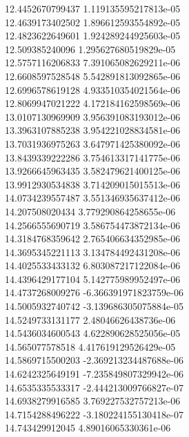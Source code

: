 {12.4452670799437 1.119135595217813e-05 \\
12.4639173402502 1.896612593554892e-05 \\
12.4823622649601 1.924289244925603e-05 \\
12.509385240096 1.295627680519829e-05 \\
12.5757116206833 7.391065082629211e-06 \\
12.6608597528548 5.542891813092865e-06 \\
12.6996578619128 4.933510354021564e-06 \\
12.8069947021222 4.172184162598569e-06 \\
13.0107130969909 3.956391083193012e-06 \\
13.3963107885238 3.954221028834581e-06 \\
13.7031936975263 3.647971425380092e-06 \\
13.8439339222286 3.754613317141775e-06 \\
13.9266645963435 3.582479621400125e-06 \\
13.9912930534838 3.714209015015513e-06 \\
14.0734239557487 3.551346935637412e-06 \\
14.207508020434 3.779290864258655e-06 \\
14.2566555690719 3.586754473872134e-06 \\
14.3184768359642 2.765406634352985e-06 \\
14.3695345221113 3.134784492431208e-06 \\
14.4025533433132 6.803087217122084e-06 \\
14.4396429177104 5.142775989952497e-06 \\
14.4737268009276 -6.366391971823759e-06 \\
14.5005932740742 -3.139686305075884e-05 \\
14.5249733131177 2.48046626438736e-06 \\
14.5436034600543 4.622890628525056e-05 \\
14.565077578518 4.417619129526429e-05 \\
14.5869715500203 -2.369213234487688e-06 \\
14.6242325649191 -7.235849807329942e-06 \\
14.6535335533317 -2.444213009766827e-07 \\
14.6938279916585 3.769227532757213e-06 \\
14.7154288496222 -3.180224155130418e-07 \\
14.743429912045 4.89016065330361e-06 \\
}
